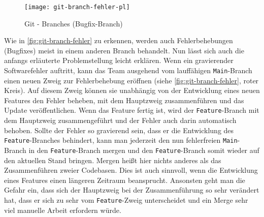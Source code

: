 \vspace{16pt}
\begin{figure}[H]
    \centering
    \texttt{[image: git-branch-fehler-pl]}
    \caption{Git - Branches (Bugfix-Branch)}
    \label{fig:git-branch-fehler}
\end{figure}
\vspace{16pt}

Wie in \autoref{fig:git-branch-fehler} zu erkennen, werden auch Fehlerbehebungen
(Bugfixes) meist in einem anderen Branch behandelt. Nun lässt sich auch die
anfangs erläuterte Problemstellung leicht erklären. Wenn ein gravierender
Softwarefehler auftritt, kann das Team ausgehend vom lauffähigen
\texttt{Main}-Branch einen neuen Zweig zur Fehlerbehebung eröffnen (siehe
\autoref{fig:git-branch-fehler}, roter Kreis). Auf diesem Zweig können sie
unabhängig von der Entwicklung eines neuen Features den Fehler beheben, mit dem
Hauptzweig zusammenführen und das Update veröffentlichen. Wenn das Feature
fertig ist, wird der \texttt{Feature}-Branch mit dem Hauptzweig zusammengeführt
und der Fehler auch darin automatisch behoben. Sollte der Fehler so gravierend
sein, dass er die Entwicklung des \texttt{Feature}-Branches behindert, kann man 
jederzeit den nun fehlerfreien \texttt{Main}-Branch in den
\texttt{Feature}-Branch mergen und den \texttt{Feature}-Branch somit wieder auf
den aktuellen Stand bringen. Mergen heißt hier nichts anderes als das
Zusammenführen zweier Codebasen. Dies ist auch sinnvoll, wenn die Entwicklung
eines Features einen längeren Zeitraum beansprucht. Ansonsten geht man die
Gefahr ein, dass sich der Hauptzweig bei der Zusammenführung so sehr verändert
hat, dass er sich zu sehr vom \texttt{Feature}-Zweig unterscheidet und ein Merge
sehr viel manuelle Arbeit erfordern würde.

